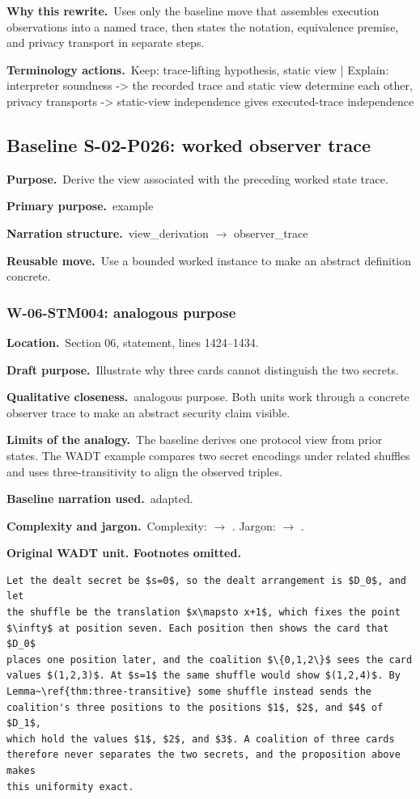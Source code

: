 \documentclass[10pt]{article}
\newcommand{\Field}[2]{\textbf{#1}\ #2\par}\newcommand{\Tag}[1]{\fcolorbox{black!25}{black!4}{\strut\scriptsize #1}}
\begin{document}
\Field{Why this rewrite.}{Uses only the baseline move that assembles execution observations into a named trace, then states the notation, equivalence premise, and privacy transport in separate steps.}
\Field{Terminology actions.}{Keep: trace-lifting hypothesis, static view | Explain: interpreter soundness -> the recorded trace and static view determine each other, privacy transports -> static-view independence gives executed-trace independence}
\par\smallskip
\clearpage\subsection{Baseline S-02-P026: worked observer trace}
\colorbox{BaselineBlue}{\parbox{0.97\textwidth}{\Field{Purpose.}{Derive the view associated with the preceding worked state trace.}\Field{Primary purpose.}{example}\Field{Narration structure.}{view\_derivation $\rightarrow$ observer\_trace}\Field{Reusable move.}{Use a bounded worked instance to make an abstract definition concrete.}}}
\subsubsection*{W-06-STM004: analogous purpose}
\Field{Location.}{Section 06, statement, lines 1424--1434.}
\Field{Draft purpose.}{Illustrate why three cards cannot distinguish the two secrets.}
\Field{Qualitative closeness.}{analogous purpose. Both units work through a concrete observer trace to make an abstract security claim visible.}
\Field{Limits of the analogy.}{The baseline derives one protocol view from prior states. The WADT example compares two secret encodings under related shuffles and uses three-transitivity to align the observed triples.}
\Field{Baseline narration used.}{adapted.}
\Field{Complexity and jargon.}{Complexity: \Tag{high} $\rightarrow$ \Tag{medium}. Jargon: \Tag{medium} $\rightarrow$ \Tag{medium}.}
\textbf{Original WADT unit. Footnotes omitted.}
\begin{lstlisting}
Let the dealt secret be $s=0$, so the dealt arrangement is $D_0$, and let
the shuffle be the translation $x\mapsto x+1$, which fixes the point
$\infty$ at position seven. Each position then shows the card that $D_0$
places one position later, and the coalition $\{0,1,2\}$ sees the card
values $(1,2,3)$. At $s=1$ the same shuffle would show $(1,2,4)$. By
Lemma~\ref{thm:three-transitive} some shuffle instead sends the
coalition's three positions to the positions $1$, $2$, and $4$ of $D_1$,
which hold the values $1$, $2$, and $3$. A coalition of three cards
therefore never separates the two secrets, and the proposition above makes
this uniformity exact.
\end{lstlisting}
\end{document}
